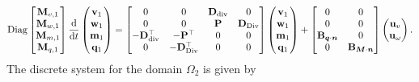 \documentclass[11pt,a4paper]{article}
\renewcommand{\div}{\operatorname{div}}
\DeclareMathOperator*{\Div}{Div}
\begin{document}
\begin{equation}\label{eq:discrete_clamped_mindlin}
\mathrm{Diag}
\begin{bmatrix}
\mathbf{M}_{v, 1} \\
\mathbf{M}_{w, 1} \\
\mathbf{M}_{m, 1} \\
\mathbf{M}_{q, 1} \\
\end{bmatrix}
    \odv{}{t}
    \begin{pmatrix}
        \mathbf{v}_1 \\
        \mathbf{w}_1 \\
        \mathbf{m}_1 \\
        \mathbf{q}_1
    \end{pmatrix} = 
    \begin{bmatrix}
        0 & 0 & \mathbf{D}_{\div} & 0 \\
        0 & 0 & \mathbf{P} & \mathbf{D}_{\Div} \\
        -\mathbf{D}_{\div}^\top & -\mathbf{P}^\top & 0 & 0 \\
        0 & -\mathbf{D}_{\Div}^\top & 0 & 0
    \end{bmatrix}
    \begin{pmatrix}
        \mathbf{v}_1 \\
        \mathbf{w}_1 \\
        \mathbf{m}_1 \\
        \mathbf{q}_1
    \end{pmatrix} + \begin{bmatrix}
        0 & 0 \\
        0 & 0 \\
         \mathbf{B}_{\bm{q} \cdot \bm{n}} & 0 \\
        0 & \mathbf{B}_{\bm{M}\cdot \bm{n}} \\
    \end{bmatrix}\begin{pmatrix}
        \mathbf{u}_v \\
        \mathbf{u}_\omega
    \end{pmatrix}.
\end{equation}
The discrete system for the domain $\Omega_2$ is given by
\end{document}
